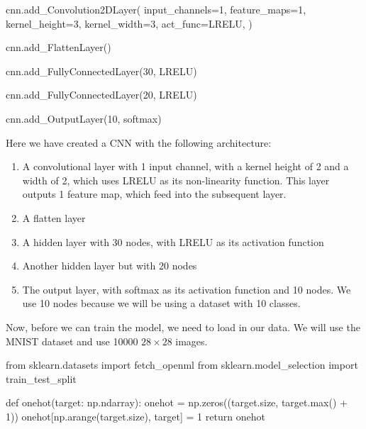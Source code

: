 \documentclass[%
oneside,                 %
final,                   %
10pt]{article}
\begin{document}
\bpycod
cnn.add_Convolution2DLayer(
    input_channels=1,
    feature_maps=1,
    kernel_height=3,
    kernel_width=3,
    act_func=LRELU,
)

cnn.add_FlattenLayer()

cnn.add_FullyConnectedLayer(30, LRELU)

cnn.add_FullyConnectedLayer(20, LRELU)

cnn.add_OutputLayer(10, softmax)

\epycod


Here we have created a CNN with the following architecture:

\begin{enumerate}
\item A convolutional layer with 1 input channel, with a kernel height of 2 and a width of 2, which uses LRELU as its non-linearity function. This layer outputs 1 feature map, which feed into the subsequent layer.

\item A flatten layer

\item A hidden layer with 30 nodes, with LRELU as its activation function

\item Another hidden layer but with 20 nodes

\item The output layer, with softmax as its activation function and 10 nodes. We use 10 nodes because we will be using a dataset with 10 classes.
\end{enumerate}

\noindent
Now, before we can train the model, we need to load in our data. We
will use the MNIST dataset and use 10000 $28 \times  28$ images.


























\bpycod
from sklearn.datasets import fetch_openml
from sklearn.model_selection import train_test_split

def onehot(target: np.ndarray):
    onehot = np.zeros((target.size, target.max() + 1))
    onehot[np.arange(target.size), target] = 1
    return onehot
\end{document}
